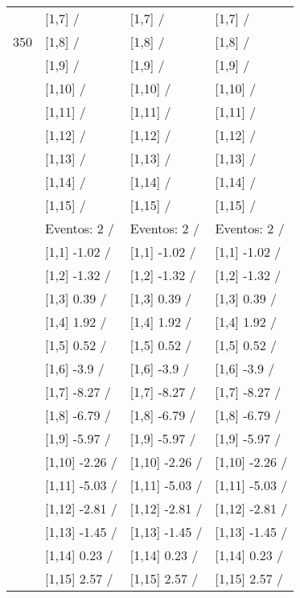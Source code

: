 \begin{table}
\begin{tabular}[t]{llll}
 & {}[1,7]  / & {}[1,7]  / & {}[1,7]  /\\
350 & {}[1,8]  / & {}[1,8]  / & {}[1,8]  /\\
\addlinespace
 & {}[1,9]  / & {}[1,9]  / & {}[1,9]  /\\
 & {}[1,10]  / & {}[1,10]  / & {}[1,10]  /\\
 & {}[1,11]  / & {}[1,11]  / & {}[1,11]  /\\
 & {}[1,12]  / & {}[1,12]  / & {}[1,12]  /\\
 & {}[1,13]  / & {}[1,13]  / & {}[1,13]  /\\
\addlinespace
 & {}[1,14]  / & {}[1,14]  / & {}[1,14]  /\\
 & {}[1,15]  / & {}[1,15]  / & {}[1,15]  /\\
 & Eventos:  2 / & Eventos:  2 / & Eventos:  2 /\\
 & {}[1,1] -1.02  / & {}[1,1] -1.02  / & {}[1,1] -1.02  /\\
 & {}[1,2] -1.32  / & {}[1,2] -1.32  / & {}[1,2] -1.32  /\\
\addlinespace
 & {}[1,3] 0.39  / & {}[1,3] 0.39  / & {}[1,3] 0.39  /\\
 & {}[1,4] 1.92  / & {}[1,4] 1.92  / & {}[1,4] 1.92  /\\
 & {}[1,5] 0.52  / & {}[1,5] 0.52  / & {}[1,5] 0.52  /\\
 & {}[1,6] -3.9  / & {}[1,6] -3.9  / & {}[1,6] -3.9  /\\
 & {}[1,7] -8.27  / & {}[1,7] -8.27  / & {}[1,7] -8.27  /\\
\addlinespace
500 & {}[1,8] -6.79  / & {}[1,8] -6.79  / & {}[1,8] -6.79  /\\
 & {}[1,9] -5.97  / & {}[1,9] -5.97  / & {}[1,9] -5.97  /\\
 & {}[1,10] -2.26  / & {}[1,10] -2.26  / & {}[1,10] -2.26  /\\
 & {}[1,11] -5.03  / & {}[1,11] -5.03  / & {}[1,11] -5.03  /\\
 & {}[1,12] -2.81  / & {}[1,12] -2.81  / & {}[1,12] -2.81  /\\
\addlinespace
 & {}[1,13] -1.45  / & {}[1,13] -1.45  / & {}[1,13] -1.45  /\\
 & {}[1,14] 0.23  / & {}[1,14] 0.23  / & {}[1,14] 0.23  /\\
 & {}[1,15] 2.57  / & {}[1,15] 2.57  / & {}[1,15] 2.57  /\\
\bottomrule
\end{tabular}
\end{table}

